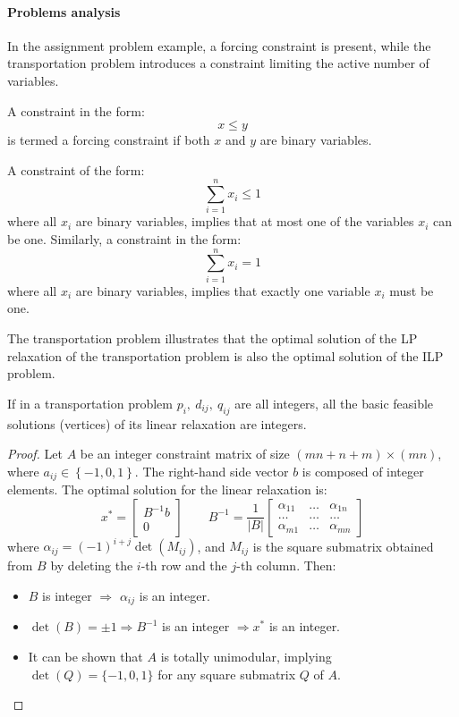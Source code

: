 \paragraph*{Problems analysis}
In the assignment problem example, a forcing constraint is present, while the transportation problem introduces a constraint limiting the active number of variables.
\begin{definition}
    A constraint in the form: 
    \[ \displaystyle x \leq y\]
    is termed a forcing constraint if both $x$ and $y$ are binary variables.
\end{definition}
\begin{definition}
    A constraint of the form:
    \[ \displaystyle \sum_{i=1}^n x_i \leq 1 \]
    where all $x_i$ are binary variables, implies that at most one of the variables $x_i$ can be one. 
    Similarly, a constraint in the form: 
    \[ \displaystyle \sum_{i=1}^n x_i = 1 \]
    where all $x_i$ are binary variables, implies that exactly one variable $x_i$ must be one.
\end{definition}
The transportation problem illustrates that the optimal solution of the LP relaxation of the transportation problem is also the optimal solution of the ILP problem.
\begin{theorem}
    If in a transportation problem $p_i, \ d_{ij}, \ q_{ij}$ are all integers, all the basic feasible solutions (vertices) of its linear relaxation are integers.
\end{theorem}
\begin{proof}
    Let $A$ be an integer constraint matrix of size $\left( mn + n + m \right) \times \left( mn \right)$, where $a_{ij} \in \left\{ -1, 0, 1 \right\}$.
    The right-hand side vector $b$ is composed of integer elements.
    The optimal solution for the linear relaxation is:
    \[ x^\ast = \begin{bmatrix}
        B^{-1} b \\ 0
    \end{bmatrix}
    \qquad
    B^{-1} = \dfrac{1}{|B|}
    \begin{bmatrix}
        \alpha_{11} & \dots  & \alpha_{1n} \\
        \ldots      & \ldots & \ldots      \\
        \alpha_{m1} & \dots  & \alpha_{mn}
    \end{bmatrix}
    \]
    where $\alpha_{ij} = (-1)^{i+j} \det\left( M_{ij} \right)$, and $M_{ij}$ is the square submatrix obtained from $B$ by deleting the $i$-th row and the $j$-th column.
    Then:
    \begin{itemize}
        \item $B$ is integer $\Rightarrow$ $\alpha_{ij}$ is an integer.
        \item $\det\left( B \right) = \pm 1 \Rightarrow B^{-1}$ is an integer $\Rightarrow x^\ast$ is an integer.
        \item It can be shown that $A$ is totally unimodular, implying $\det\left( Q \right) = \{-1, 0, 1\}$ for any square submatrix $Q$ of $A$.    
    \end{itemize}
\end{proof}

